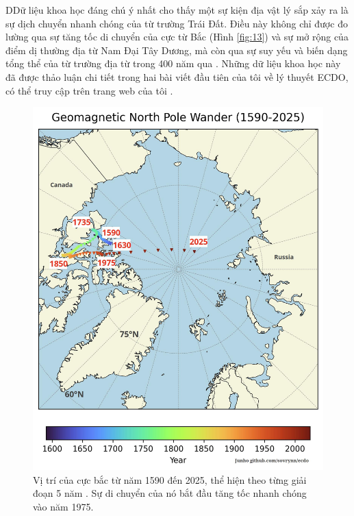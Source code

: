 DDữ liệu khoa học đáng chú ý nhất cho thấy một sự kiện địa vật lý sắp xảy ra là sự dịch chuyển nhanh chóng của từ trường Trái Đất. Điều này không chỉ được đo lường qua sự tăng tốc di chuyển của cực từ Bắc (Hình \ref{fig:13}) và sự mở rộng của điểm dị thường địa từ Nam Đại Tây Dương, mà còn qua sự suy yếu và biến dạng tổng thể của từ trường địa từ trong 400 năm qua \cite{3}. Những dữ liệu khoa học này đã được thảo luận chi tiết trong hai bài viết đầu tiên của tôi về lý thuyết ECDO, có thể truy cập trên trang web của tôi \cite{3}.

\begin{figure}[t]
\begin{center}
   \includegraphics[width=1\linewidth]{npw.jpg}
\end{center}
   \caption{Vị trí của cực bắc từ năm 1590 đến 2025, thể hiện theo từng giải đoạn 5 năm \cite{41}. Sự di chuyển của nó bắt đầu tăng tốc nhanh chóng vào năm 1975.}
\label{fig:13}
\label{fig:onecol}
\end{figure}

